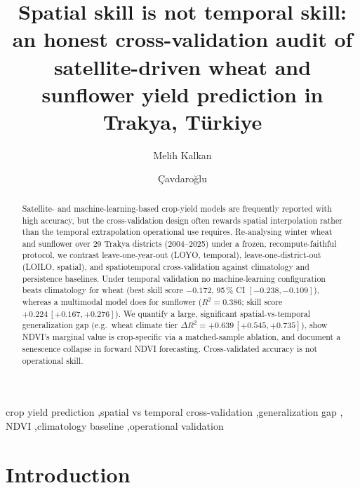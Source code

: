 \documentclass[preprint,12pt]{elsarticle}
\begin{document}
\begin{frontmatter}
\title{Spatial skill is not temporal skill: an honest cross-validation audit of
satellite-driven wheat and sunflower yield prediction in Trakya, T\"urkiye}

\author[a]{Melih Kalkan}
\author[a]{\c{C}avdaro\u{g}lu} %
\address[a]{VERIFY: institution, Trakya, T\"urkiye}

\begin{abstract}
Satellite- and machine-learning-based crop-yield models are frequently reported with high
accuracy, but the cross-validation design often rewards spatial interpolation rather than the
temporal extrapolation operational use requires. Re-analysing winter wheat and sunflower over 29
Trakya districts (2004--2025) under a frozen, recompute-faithful protocol, we contrast
leave-one-year-out (LOYO, temporal), leave-one-district-out (LOILO, spatial), and spatiotemporal
cross-validation against climatology and persistence baselines. Under temporal validation no
machine-learning configuration beats climatology for wheat (best skill score $-0.172$, 95\,\% CI
$[-0.238,-0.109]$), whereas a multimodal model does for sunflower ($R^2=0.386$; skill score
$+0.224\,[+0.167,+0.276]$). We quantify a large, significant spatial-vs-temporal generalization gap
(e.g.\ wheat climate tier $\Delta R^2=+0.639\,[+0.545,+0.735]$), show NDVI's marginal value is
crop-specific via a matched-sample ablation, and document a senescence collapse in forward NDVI
forecasting. Cross-validated accuracy is not operational skill.
\end{abstract}

\begin{keyword}
crop yield prediction \sep spatial vs temporal cross-validation \sep generalization gap \sep
NDVI \sep climatology baseline \sep operational validation
\end{keyword}
\end{frontmatter}


\section{Introduction}\label{sec:intro}
\end{document}

